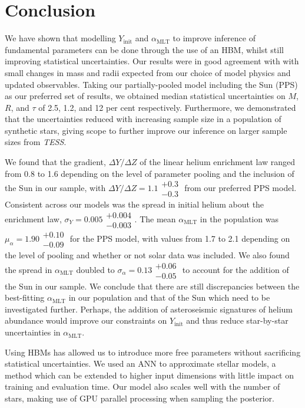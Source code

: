 \documentclass[a4paper,fleqn,usenatbib]{mnras}
\newcommand{\mlt}{\ensuremath{{\alpha_\mathrm{MLT}}}}
\begin{document}
\section{Conclusion}


We have shown that modelling $Y_\mathrm{init}$ and $\mlt$ to improve inference of fundamental parameters can be done through the use of an HBM, whilst still improving statistical uncertainties. Our results were in good agreement with  with small changes in mass and radii expected from our choice of model physics and updated observables. Taking our partially-pooled model including the Sun (PPS) as our preferred set of results, we obtained median statistical uncertainties on $M$, $R$, and $\tau$ of 2.5, 1.2, and 12 per cent respectively. Furthermore, we demonstrated that the uncertainties reduced with increasing sample size in a population of synthetic stars, giving scope to further improve our inference on larger sample sizes from \emph{TESS}.

We found that the gradient, $\Delta Y / \Delta Z$ of the linear helium enrichment law ranged from 0.8 to 1.6 depending on the level of parameter pooling and the inclusion of the Sun in our sample, with $\Delta Y / \Delta Z = 1.1\substack{+0.3\\-0.3}$ from our preferred PPS model. Consistent across our models was the spread in initial helium about the enrichment law, $\sigma_Y = 0.005\substack{+0.004\\-0.003}$. The mean $\mlt$ in the population was $\mu_\alpha = 1.90\substack{+0.10\\-0.09}$ for the PPS model, with values from 1.7 to 2.1 depending on the level of pooling and whether or not solar data was included. We also found the spread in $\mlt$ doubled to $\sigma_\alpha = 0.13\substack{+0.06\\-0.05}$ to account for the addition of the Sun in our sample. We conclude that there are still discrepancies between the best-fitting $\mlt$ in our population and that of the Sun which need to be investigated further. Perhaps, the addition of asteroseismic signatures of helium abundance \citep[see e.g.][]{Verma.Raodeo.ea2017} would improve our constraints on $Y_\mathrm{init}$ and thus reduce star-by-star uncertainties in $\mlt$.

Using HBMs has allowed us to introduce more free parameters without sacrificing statistical uncertainties. We used an ANN to approximate stellar models, a method which can be extended to higher input dimensions with little impact on training and evaluation time. Our model also scales well with the number of stars, making use of GPU parallel processing when sampling the posterior.
\end{document}
